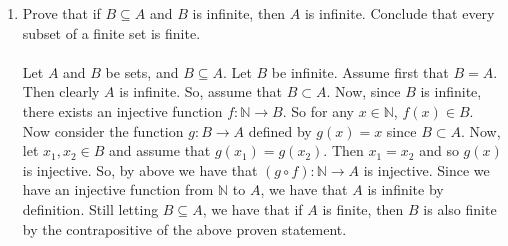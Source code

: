 \documentclass[12pt]{article}
\begin{document}
\begin{enumerate}
\item Prove that if $B\subseteq A$ and $B$ is infinite, then $A$ is infinite. Conclude that every subset of a finite set is finite.\\\\
Let $A$ and $B$ be sets, and $B\subseteq A$. Let $B$ be infinite. Assume first that $B=A$. Then clearly $A$ is infinite. So, assume that $B\subset A$. Now, since $B$ is infinite, there exists an injective function $f:\mathbb{N}\rightarrow B$. So for any $x\in\mathbb{N}$, $f(x)\in B$. Now consider the function $g:B\rightarrow A$ defined by $g(x)=x$ since $B\subset A$. Now, let $x_1,x_2\in B$ and assume that $g(x_1)=g(x_2)$. Then $x_1=x_2$ and so $g(x)$ is injective. So, by above we have that $(g\circ f):\mathbb{N}\rightarrow A$ is injective. Since we have an injective function from $\mathbb{N}$ to $A$, we have that $A$ is infinite by definition. Still letting $B\subseteq A$, we have that if $A$ is finite, then $B$ is also finite by the contrapositive of the above proven statement.\\[20pt]



\end{enumerate}
\end{document}

